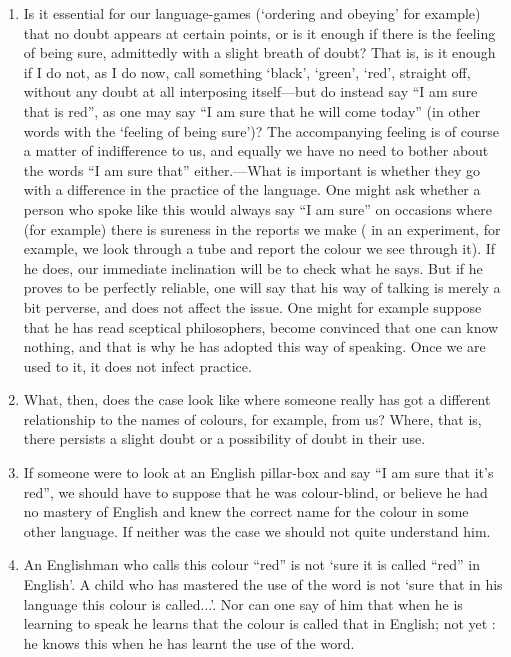 \documentclass{book}
\begin{document}
\begin{enumerate}
\item
Is it essential for our language-games (`ordering and obeying' for example)
that no doubt appears at certain points, or is it enough if there is the
feeling of being sure, admittedly with a slight breath of doubt?  That is, is
it enough if I do not, as I do now, call something `black', `green', `red',
straight off, without any doubt at all interposing itself---but do instead say
``I am sure that is red'', as one may say ``I am sure that he will come today''
(in other words with the `feeling of being sure')?  The accompanying feeling is
of course a matter of indifference to us, and equally we have no need to bother
about the words ``I am sure that'' either.---What is important is whether they
go with a difference in the practice of the language.  One might ask whether a
person who spoke like this would always say ``I am sure'' on occasions where
(for example) there is sureness in the reports we make ( in an experiment, for
example, we look through a tube and report the colour we see through it). If he
does, our immediate inclination will be to check what he says. But if he proves
to be perfectly reliable, one will say that his way of talking is merely a bit
perverse, and does not affect the issue. One might for example suppose that he
has read sceptical philosophers, become convinced that one can know nothing,
and that is why he has adopted this way of speaking. Once we are used to it, it
does not infect practice.

\item
What, then, does the case look like where someone really has got a different
relationship to the names of colours, for example, from us? Where, that is,
there persists a slight doubt or a possibility of doubt in their use.

\item
If someone were to look at an English pillar-box and say ``I am sure that it's
red'', we should have to suppose that he was colour-blind, or believe he had no
mastery of English and knew the correct name for the colour in some other
language.  If neither was the case we should not quite understand him.

\item
An Englishman who calls this colour ``red'' is not `sure it is called ``red''
in English'.  A child who has mastered the use of the word is not `sure that in
his language this colour is called...'. Nor can one say of him that when he is
learning to speak he learns that the colour is called that in English; not yet
: he knows this when he has learnt the use of the word.


\end{enumerate}
\end{document}
